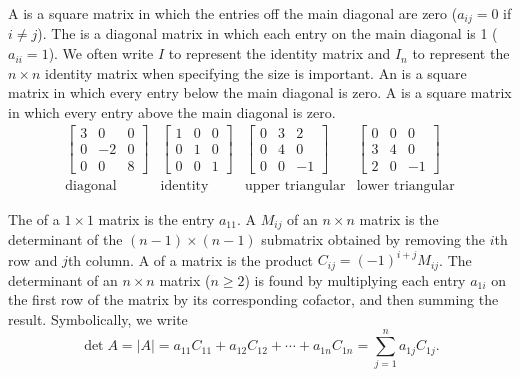 \begin{definition}
A  is a square matrix in which the entries off the main diagonal are zero ($a_{ij}=0$ if $i\neq j$). The  is a diagonal matrix in which each entry on the main diagonal is 1 ($a_{ii}=1$). We often write $I$ to represent the identity matrix and $I_n$ to represent the $n\times n$ identity matrix when specifying the size is important. An  is a square matrix in which every entry below the main diagonal is zero. A  is a square matrix in which every entry above the main diagonal is zero.
$$\begin{array}{cccc}
\begin{bmatrix} 3&0&0\\0&-2&0\\0&0&8\end{bmatrix} 
&\begin{bmatrix} 1&0&0\\0&1&0\\0&0&1\end{bmatrix} 
&\begin{bmatrix} 0&3&2\\0&4&0\\0&0&-1\end{bmatrix}
&\begin{bmatrix} 0&0&0\\3&4&0\\2&0&-1\end{bmatrix} 
\\
\text{diagonal}
&\text{identity}
&\text{upper triangular}
&\text{lower triangular}
\end{array}$$
\end{definition}



\begin{definition}[Determinant] 
%
The  of a $1\times 1$ matrix is the entry $a_{11}$. A  $M_{ij}$ of an $n\times n$ matrix is the determinant of the $(n-1)\times (n-1)$ submatrix obtained by removing the $i$th row and $j$th column. A  of a matrix is the product $C_{ij}=(-1)^{i+j}M_{ij}$. The determinant of an $n\times n$ matrix ($n\geq 2$) is found by multiplying each entry $a_{1i}$ on the first row of the matrix by its corresponding cofactor, and then summing the result. Symbolically, we write  $$\det A = |A| = a_{11}C_{11}+a_{12}C_{12}+\cdots+a_{1n}C_{1n} = \sum_{j=1}^n a_{1j}C_{1j}.$$ 
\end{definition}


